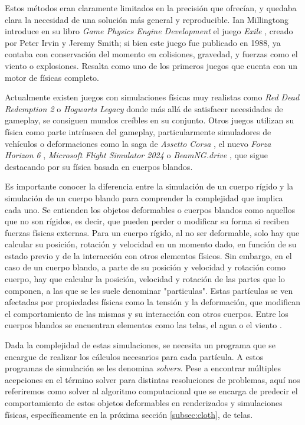 Estos métodos eran claramente limitados en la precisión que ofrecían, y quedaba clara la necesidad de una solución más general y reproducible. Ian Millingtong introduce en su libro \textit{Game Physics Engine Development} \cite{millington2007game} el juego \textit{Exile} \cite{exile1988}, creado por Peter Irvin y Jeremy Smith; si bien este juego fue publicado en 1988, ya contaba con conservación del momento en colisiones, gravedad, y fuerzas como el viento o explosiones. Resalta como uno de los primeros juegos que cuenta con un motor de físicas completo. \newline

Actualmente existen juegos con simulaciones físicas muy realistas como \textit{Red Dead Redemption 2} \cite{rdr2} o \textit{Hogwarts Legacy} \cite{hogwarts} donde más allá de satisfacer necesidades de gameplay, se consiguen mundos creíbles en su conjunto. Otros juegos utilizan su física como parte intrínseca del gameplay, particularmente simuladores de vehículos o deformaciones como la saga de \textit{Assetto Corsa} \cite{assettocorsa}, el nuevo \textit{Forza Horizon 6} \cite{forza6}, \textit{Microsoft Flight Simulator 2024} \cite{msfs2024} o \textit{BeamNG.drive} \cite{beamng}, que sigue destacando por su física basada en cuerpos blandos. \newline

Es importante conocer la diferencia entre la simulación de un cuerpo rígido y la simulación de un cuerpo blando para comprender la complejidad que implica cada uno. Se entienden los objetos deformables o cuerpos blandos como aquellos que no son rígidos, es decir, que pueden perder o modificar su forma si reciben fuerzas físicas externas. Para un cuerpo rígido, al no ser deformable, solo hay que calcular su posición, rotación y velocidad en un momento dado, en función de su estado previo y de la interacción con otros elementos físicos. Sin embargo, en el caso de un cuerpo blando, a parte de su posición y velocidad y rotación como cuerpo, hay que calcular la posición, velocidad y rotación de las partes que lo componen, a las que se les suele denominar "particulas". Estas partículas se ven afectadas por propiedades físicas como la tensión y la deformación, que modifican el comportamiento de las mismas y su interacción con otros cuerpos. Entre los cuerpos blandos se encuentran elementos como las telas, el agua o el viento \cite{erlebenbook}. \newline

Dada la complejidad de estas simulaciones, se necesita un programa que se encargue de realizar los cálculos necesarios para cada partícula. A estos programas de simulación se les denomina \textit{solvers}. Pese a encontrar múltiples acepciones en el término solver para distintas resoluciones de problemas, aquí nos referiremos como solver al algoritmo computacional que se encarga de predecir el comportamiento de estos objetos deformables en renderizados y simulaciones físicas, específicamente en la próxima sección \ref{subsec:cloth}, de telas. \newline

